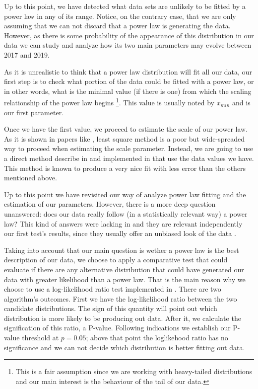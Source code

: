 \documentclass{article}
\begin{document}
Up to this point, we have detected what data sets are unlikely to be
fitted by a power law in any of its range. Notice, on the contrary
case, that we are only assuming that we can not discard that a power
law is generating the data.  However, as there is some probability of
the appearance of this distribution in our data we can study and
analyze how its two main parameters may evolve between 2017 and 2019.

As it is unrealistic to think that a power law distribution will fit
all our data, our first step is to check what portion of the data
could be fitted with a power law, or in other words, what is the
minimal value (if there is one) from which the scaling relationship of
the power law begins \footnote{This is a fair assumption since we are
  working with heavy-tailed distributions and our main interest is the
  behaviour of the tail of our data.}.  This value is usually noted by
$x_{min}$ and is our first parameter.

Once we have the first value, we proceed to estimate the scale of our
power law.  As it is shown in papers like \cite{newman2005power,
  clauset2009power}, least square method is a poor but wide-spreaded
way to proceed when estimating the scale parameter. Instead, we are
going to use a direct method describe in \cite{clauset2009power} and
implemented in \cite{alstott2014powerlaw} that use the data values we
have. This method is known to produce a very nice fit with less error
than the others mentioned above.

Up to this point we have revisited our way of analyze power law
fitting and the estimation of our parameters. However, there is a more
deep question unanswered: does our data really follow (in a
statistically relevant way) a power law?  This kind of answers were
lacking in \cite{merelo2017self} and they are relevant independently
our first test's results, since they usually offer an unbiased look of
the data .

Taking into account that our main question is wether a power law is
the best description of our data, we choose to apply a comparative
test that could evaluate if there are any alternative distribution
that could have generated our data with greater likelihood than a
power law. That is the main reason why we choose to use a
log-likelihood ratio test implemented in \cite{alstott2014powerlaw}.
There are two algorithm's outcomes. First we have the log-likelihood
ratio between the two candidate distributions. The sign of this
quantity will point out which distribution is more likely to be
producing out data. After it, we calculate the signification of this
ratio, a P-value. Following \cite{alstott2014powerlaw} indications we
establish our P-value threshold at $p=0.05$; above that point the
loglikehood ratio has no significance and we can not decide which
distribution is better fitting out data.
\end{document}
